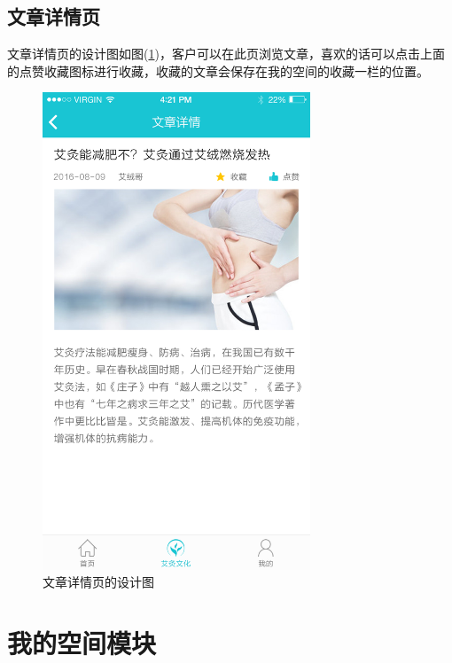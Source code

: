     \subsection{文章详情页}
      \label{subsec:文章详情页}
        文章详情页的设计图如图(\ref{fig:artdetail_dsn})，客户可以在此页浏览文章，喜欢的话可以点击上面的点赞收藏图标进行收藏，收藏的文章会保存在我的空间的收藏一栏的位置。
        \begin{figure}[htbp]
          \centering
          \includegraphics[width=8cm]{./img/artdetail_dsn.png}
          \caption{文章详情页的设计图}
          \label{fig:artdetail_dsn}
        \end{figure}

\clearpage
\section{我的空间模块}
  \label{sec:我的空间模块}
